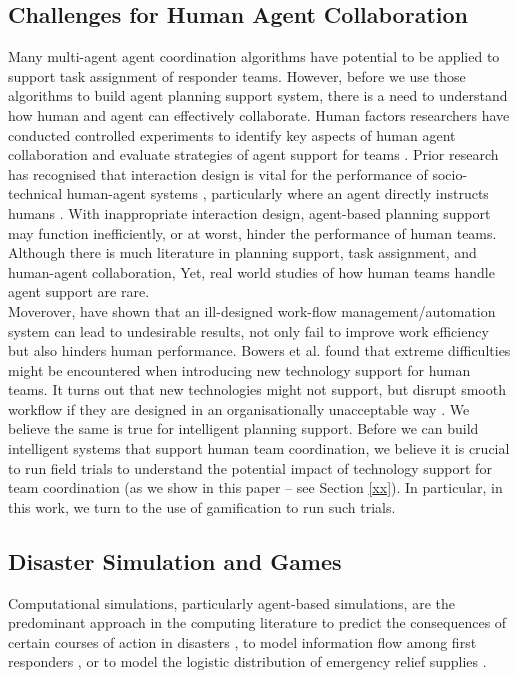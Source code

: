 \subsection{Challenges for Human Agent Collaboration}
Many multi-agent agent coordination algorithms have potential to be applied to support task assignment of responder teams. However, before we use those algorithms to build agent planning support system, there is a need to understand how human and agent can effectively collaborate.  Human factors researchers have conducted controlled experiments to identify key aspects of human agent collaboration \cite{Bradshaw2011}\cite{Cooke2006} \cite{Sukthankar} \cite{Wagner2004} and evaluate strategies of agent support for teams \cite{Lenox2000}. Prior research has recognised that interaction design is vital for the performance of socio-technical human-agent systems \cite{Rachlin1997}, particularly where an agent directly instructs humans \cite{Moran2013}. With inappropriate interaction design, agent-based planning support may function inefficiently, or at worst, hinder the performance of human teams. Although there is much literature in planning support, task assignment, and human-agent collaboration, Yet, real world studies of how human teams handle agent support are rare. \\

Moverover, \cite{Bowers1994} have shown that an ill-designed work-flow management/automation system can lead to undesirable results, not only fail to improve work efficiency but also hinders human performance. Bowers et al. found that extreme difficulties might be encountered when introducing new technology support for human teams. It turns out that new technologies might not support, but  disrupt smooth workflow if they are designed in an organisationally unacceptable way \cite{Abbott1994}. We believe the same is true for intelligent planning support. Before we can build intelligent systems that support human team coordination, we believe it is crucial to run field trials to understand the potential impact of technology support for team coordination (as we show in this paper -- see Section \ref{xx}). In particular, in this work, we turn to the use of gamification to run such trials. \\

\subsection{Disaster Simulation and Games }
Computational simulations, particularly agent-based simulations, are the predominant approach in the computing literature to predict the consequences of certain courses of action in disasters \cite{Hawe2012}, to model information flow among first responders \cite{Robinson}, or to model the logistic distribution of emergency relief supplies \cite{Lee2009}.\\

